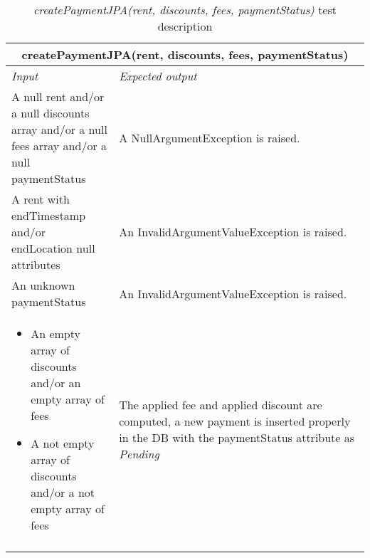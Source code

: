 \begin{longtable}{p{0.3\linewidth}p{0.7\linewidth}}
\multicolumn{2}{c}{\textbf{createPaymentJPA(rent, discounts, fees, paymentStatus)}} \\
\toprule
\emph{Input} & \emph{Expected output} \\
\midrule
A null rent and/or a null discounts array and/or a null fees array and/or a null paymentStatus & A NullArgumentException is raised.\\
\midrule
A rent with endTimestamp and/or endLocation null attributes & An InvalidArgumentValueException is raised. \\
\midrule
An unknown paymentStatus & An InvalidArgumentValueException is raised. \\
\midrule
\begin{itemize}
\item An empty array of discounts and/or an empty array of fees
\item A not empty array of discounts and/or a not empty array of fees
\end{itemize} & The applied fee and applied discount are computed, a new payment is inserted properly in the DB with the paymentStatus attribute as \emph{Pending}\\
\bottomrule
\caption{\emph{createPaymentJPA(rent, discounts, fees, paymentStatus)} test description}
\end{longtable}

